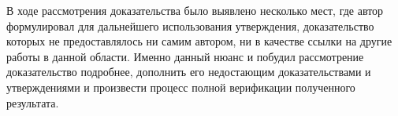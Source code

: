 \documentclass[times,specification,annotation]{itmo-student-thesis}
\begin{document}
В ходе рассмотрения доказательства было выявлено несколько мест, где автор формулировал для дальнейшего использования утверждения, доказательство которых не предоставлялось ни самим автором, ни в качестве ссылки на другие работы в данной области. Именно данный нюанс и побудил рассмотрение доказательство подробнее, дополнить его недостающим доказательствами и утверждениями и произвести процесс полной верификации полученного результата.

\startrelatedwork
\finishrelatedwork





\end{document}
